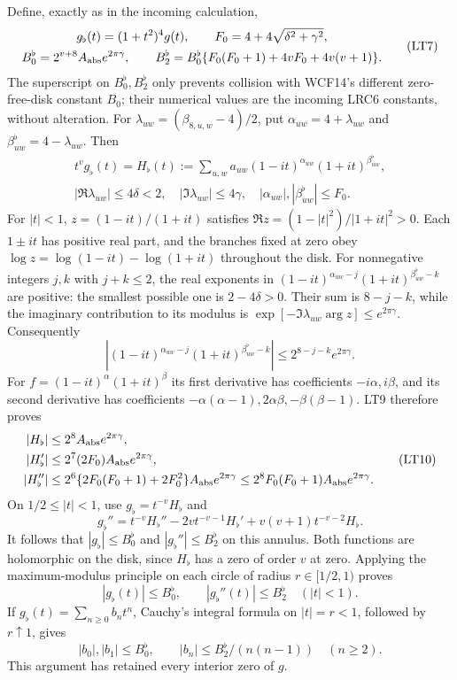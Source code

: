 Define, exactly as in the incoming calculation,
\[
\begin{gathered}
 g_\flat(t)=(1+t^2)^4g(t),\qquad
 F_0=4+4\sqrt{\delta^2+\gamma^2},\\
 B_0^{\flat}=2^{v+8}A_{\rm abs}e^{2\pi\gamma},\qquad
 B_2^{\flat}=B_0^{\flat}
 \{F_0(F_0+1)+4vF_0+4v(v+1)\}.
\end{gathered}                                                   \tag{LT7}
\]
The superscript on $B_0^{\flat},B_2^{\flat}$ only prevents collision
with WCF14's different zero-free-disk constant $B_0$; their numerical
values are the incoming LRC6 constants, without alteration.
For $\lambda_{uw}=(\beta_{8,u,w}-4)/2$, put
$\alpha_{uw}=4+\lambda_{uw}$ and $\beta^{\flat}_{uw}=4-\lambda_{uw}$.
Then
\[
\begin{gathered}
 t^vg_\flat(t)=H_\flat(t):=
 \sum_{u,w}a_{uw}(1-it)^{\alpha_{uw}}(1+it)^{\beta^{\flat}_{uw}},
 \\ |\Re\lambda_{uw}|\le4\delta<2,
 \quad |\Im\lambda_{uw}|\le4\gamma,
 \quad |\alpha_{uw}|,|\beta^{\flat}_{uw}|\le F_0.
\end{gathered}            \tag{LT8}
\]
For $|t|<1$, $z=(1-it)/(1+it)$ satisfies
$\Re z=(1-|t|^2)/|1+it|^2>0$. Each $1\pm it$ has positive
real part, and the branches fixed at zero obey
$\log z=\log(1-it)-\log(1+it)$ throughout the disk.
For nonnegative integers $j,k$ with $j+k\le2$, the real exponents
in $(1-it)^{\alpha_{uw}-j}(1+it)^{\beta^{\flat}_{uw}-k}$ are
positive: the smallest possible one is $2-4\delta>0$.
Their sum is $8-j-k$, while the imaginary contribution to its
modulus is $\exp[-\Im\lambda_{uw}\arg z]\le e^{2\pi\gamma}$.
Consequently
\[
 |(1-it)^{\alpha_{uw}-j}(1+it)^{\beta^{\flat}_{uw}-k}|
 \le 2^{8-j-k}e^{2\pi\gamma}.                              \tag{LT9}
\]
For $f=(1-it)^\alpha(1+it)^\beta$ its first derivative has
coefficients $-i\alpha,i\beta$, and its second derivative has
coefficients $-\alpha(\alpha-1),2\alpha\beta,-\beta(\beta-1)$.
LT9 therefore proves
\[
\begin{split}
 |H_\flat|&\le2^8A_{\rm abs}e^{2\pi\gamma},\\
 |H_\flat'|&\le2^7(2F_0)A_{\rm abs}e^{2\pi\gamma},\\
 |H_\flat''|&\le2^6\{2F_0(F_0+1)+2F_0^2\}
                      A_{\rm abs}e^{2\pi\gamma}
 \le2^8F_0(F_0+1)A_{\rm abs}e^{2\pi\gamma}.
\end{split}                                                     \tag{LT10}
\]
On $1/2\le|t|<1$, use $g_\flat=t^{-v}H_\flat$ and
\[
 g_\flat''=t^{-v}H_\flat''-2vt^{-v-1}H_\flat'
                         +v(v+1)t^{-v-2}H_\flat .
\]
It follows that $|g_\flat|\le B_0^{\flat}$ and
$|g_\flat''|\le B_2^{\flat}$ on this annulus. Both functions
are holomorphic on the disk, since $H_\flat$ has a zero of order
$v$ at zero. Applying the maximum-modulus principle on each circle
of radius $r\in[1/2,1)$ proves
\[
 \boxed{|g_\flat(t)|\le B_0^{\flat},\qquad
 |g_\flat''(t)|\le B_2^{\flat}\quad(|t|<1).}              \tag{LRC6}
\]
If $g_\flat(t)=\sum_{n\ge0}b_nt^n$, Cauchy's integral formula
on $|t|=r<1$, followed by $r\uparrow1$, gives
\[
 |b_0|,|b_1|\le B_0^{\flat},\qquad
 |b_n|\le B_2^{\flat}/(n(n-1))\quad(n\ge2).               \tag{LT11}
\]
This argument has retained every interior zero of $g$.

